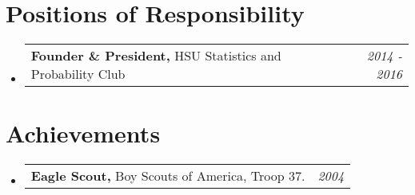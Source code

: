 \documentclass[a4paper, 11pt]{article}
\makeatletter
\newcommand{\resumePOR}[3]{
	\vspace{0.5mm}\item
	\begin{tabular*}{0.97\textwidth}[t]{l@{\extracolsep{\fill}}r}
		\textbf{#1}\hspace{0.3mm}#2 & \textit{\small{#3}} 
	\end{tabular*}
	\vspace{-2mm}
}
\newcommand{\resumeSubHeadingListStart}{\begin{itemize}[leftmargin=*,labelsep=0mm]}
\newcommand{\resumeSubHeadingListEnd}{\end{itemize}\vspace{2mm}}
\makeatother
\begin{document}
	
	
	\section{\textbf{Positions of Responsibility}}
	\vspace{-0.4mm}
	\resumeSubHeadingListStart
	
	\resumePOR{Founder \& President,  } %
	{ HSU Statistics and Probability Club} %
	{2014 - 2016} %
	
	\resumeSubHeadingListEnd
	\vspace{-5mm}
	
	
	
	
	\section{\textbf{Achievements}}
	\vspace{-0.4mm}
	\resumeSubHeadingListStart
	
	\resumePOR{Eagle Scout,  } %
		{   Boy Scouts of America, Troop 37.} %
		{2004} %

	\resumeSubHeadingListEnd
	\vspace{-5mm}
	
	
	
\end{document}
